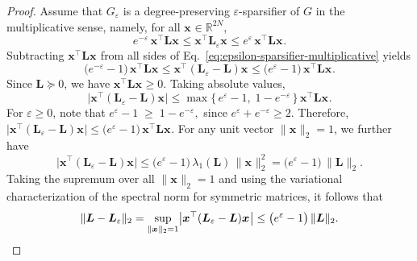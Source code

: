 \documentclass[lettersize,journal]{IEEEtran}
\newcommand{\lap}{\boldsymbol{L}}
\newcommand{\xx}[1]{\boldsymbol{x}_{#1}}
\begin{document}
{\begin{proof}
Assume that $G_\varepsilon$ is a degree-preserving $\varepsilon$-sparsifier of $G$ in the
multiplicative sense, namely, for all $\xx{}\in\mathbb{R}^{2N}$,
\begin{equation}
\label{eq:epsilon-sparsifier-multiplicative}
    e^{-\varepsilon}\,\xx{}^\top \lap \xx{}
    \le
    \xx{}^\top \lap_\varepsilon \xx{}
    \le
    e^{\varepsilon}\,\xx{}^\top \lap \xx{}.
\end{equation}
Subtracting $\xx{}^\top \lap \xx{}$ from all sides of
Eq.~\eqref{eq:epsilon-sparsifier-multiplicative} yields
\[
    \bigl(e^{-\varepsilon}-1\bigr)\,\xx{}^\top \lap \xx{}
    \le
    \xx{}^\top (\lap_\varepsilon-\lap) \xx{}
    \le
    \bigl(e^{\varepsilon}-1\bigr)\,\xx{}^\top \lap \xx{}.
\]
Since $\lap\succeq 0$, we have $\xx{}^\top \lap \xx{}\ge 0$. Taking absolute values,
\[
    \bigl|\xx{}^\top (\lap_\varepsilon-\lap) \xx{}\bigr|
    \le
    \max\{\,e^{\varepsilon}-1,\;1-e^{-\varepsilon}\,\}\,
    \xx{}^\top \lap \xx{}.
\]
For $\varepsilon\ge 0$, note that
   $ e^{\varepsilon}-1 \;\ge\; 1-e^{-\varepsilon},$
since $e^{\varepsilon}+e^{-\varepsilon}\ge 2$. Therefore, $\bigl|\xx{}^\top (\lap_\varepsilon-\lap) \xx{}\bigr|
    \le
    \bigl(e^{\varepsilon}-1\bigr)\,\xx{}^\top \lap \xx{}.$
For any unit vector $\|\xx{}\|_2=1$, we further have
\[
    \bigl|\xx{}^\top (\lap_\varepsilon-\lap) \xx{}\bigr|
    \le
    \bigl(e^{\varepsilon}-1\bigr)\,\lambda_1(\lap)\,\|\xx{}\|_2^2
    =
    \bigl(e^{\varepsilon}-1\bigr)\,\|\lap\|_2.
\]
Taking the supremum over all $\|\xx{}\|_2=1$ and using the variational
characterization of the spectral norm for symmetric matrices, it follows that
\begin{equation*}
\label{eq:lap-diff-norm-bound}
    \|\lap-\lap_\varepsilon\|_2
    =
    \sup_{\|\xx{}\|_2=1}
    \bigl|\xx{}^\top (\lap_\varepsilon-\lap) \xx{}\bigr|
    \le
    \bigl(e^{\varepsilon}-1\bigr)\,\|\lap\|_2.\qedhere
\end{equation*}
\end{proof}

}
\end{document}
